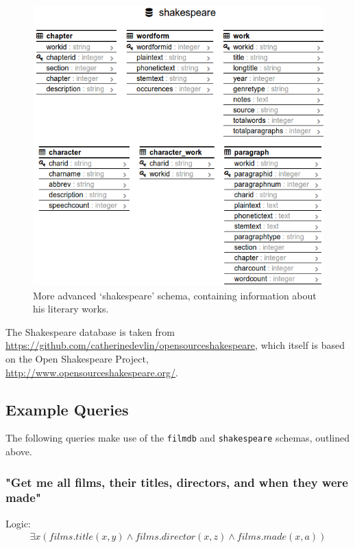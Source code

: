 \documentclass[a4paper, 11pt]{article}
\begin{document}
      \begin{figure}[H]
        \includegraphics[width=\textwidth]{images/site_schema_shakespeare.png}
        \caption{More advanced `shakespeare' schema, containing information
        about his literary works.}
      \end{figure}

      The Shakespeare database is taken from \\
      \url{https://github.com/catherinedevlin/opensourceshakespeare}, which
      itself is based on the Open Shakespeare Project, \\
      \url{http://www.opensourceshakespeare.org/}.

  \subsection{Example Queries}

  The following queries make use of the \texttt{filmdb} and
  \texttt{shakespeare} schemas, outlined above.

    \subsubsection*{"Get me all films, their titles, directors, and when they
      were made"}

      Logic:
      \begin{gather}
        \exists x(films.title(x, y) \land films.director(x, z) \land films.made(x, a))
      \end{gather}
\end{document}
